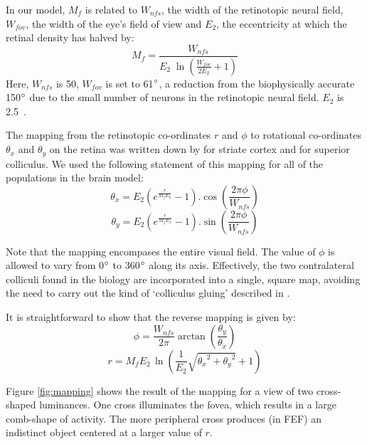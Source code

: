 \documentclass{frontiersSCNS}
\begin{document}
In our model, $M_f$ is related to $W_{nfs}$, the width of the retinotopic neural 
field, $W_{fov}$, the width of the eye's field of view and $E_2$, the 
eccentricity at which the retinal density has halved by:
\begin{equation} \label{eq:fm}
   M_f = \frac {W_{nfs}} {E_2\;\ln\left(\frac{W_{fov}}{2 E_2} + 1\right)}
\end{equation}
Here, $W_{nfs}$ is 50, $W_{fov}$ is set to 61$\degree$, a
reduction from the biophysically accurate 150$\degree$ due to the small
number of neurons in the retinotopic neural field. $E_2$ is
2.5~\cite{cope_basal_2017,slotnick_electrophysiological_2001}.

The mapping from the retinotopic co-ordinates $r$ and
$\phi$ to rotational co-ordinates $\theta_x$  and $\theta_y$ on
the retina was written
down by \cite{eric_l._schwartz_computational_1980} for striate cortex and 
\cite{ottes_visuomotor_1986} for superior colliculus. We used the following
statement of this mapping for all of the populations in
the brain model:
\begin{equation}
   \theta_x = E_2 \left(e^{\frac{r}{M_f E_2}} - 1\right).\cos\left(\frac{2 \pi \phi}{W_{nfs}}\right)
\end{equation}
\begin{equation}
   \theta_y = E_2 \left(e^{\frac{r}{M_f E_2}} - 1\right).\sin\left(\frac{2 \pi \phi}{W_{nfs}}\right)
\end{equation}

Note that the mapping encompases the entire visual field. The value of
$\phi$ is allowed to vary from 0$\degree$ to 360$\degree$ along its axis.
Effectively, the two contralateral colliculi found in the biology are 
incorporated into a
single, square map, avoiding the need to carry out the kind of `colliculus
gluing' described in \cite{tabareau_geometry_2007}.

It is straightforward to show that the reverse mapping is given by:
\begin{equation}
   \phi = \frac{W_{nfs}} {2 \pi}\arctan\left(\frac{\theta_y}{\theta_x}\right)
\end{equation}
\begin{equation}
   r = M_fE_2\,\ln\left(\frac{1}{E_2}\sqrt{{\theta_x}^2 + {\theta_y}^2}+1\right)
\end{equation}

Figure \ref{fig:mapping} shows the result of the mapping for a view of
two cross-shaped luminances. One cross illuminates the fovea, which
results in a large comb-shape of activity. The more peripheral cross
produces (in FEF) an indistinct object centered at a larger value of
$r$.
\end{document}
